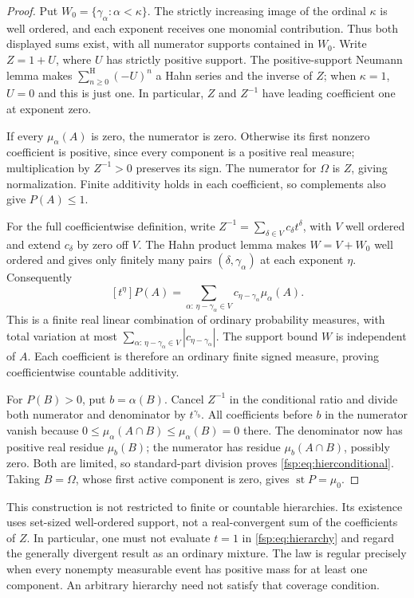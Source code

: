 \documentclass[11pt,a4paper]{article}
\numberwithin{equation}{section}
\theoremstyle{definition}
\theoremstyle{remark}
\newcommand{\st}{\operatorname{st}}
\newcommand{\hsum}{\mathop{\sum}\nolimits^{\mathrm H}}
\begin{document}
\begin{proof}
Put $W_0=\{\gamma_\alpha:\alpha<\kappa\}$. The strictly
increasing image of the ordinal $\kappa$ is well ordered, and each
exponent receives one monomial contribution. Thus both displayed sums
exist, with all numerator supports contained in $W_0$. Write $Z=1+U$,
where $U$ has strictly positive support. The positive-support Neumann
lemma makes $\hsum_{n\ge0}(-U)^n$ a Hahn series and the inverse of
$Z$; when $\kappa=1$, $U=0$ and this is just one. In particular,
$Z$ and $Z^{-1}$ have leading coefficient one at exponent zero.

If every $\mu_\alpha(A)$ is zero, the numerator is zero. Otherwise
its first nonzero coefficient is positive, since every component is a
positive real measure; multiplication by $Z^{-1}>0$ preserves its sign.
The numerator for $\Omega$ is $Z$, giving normalization. Finite
additivity holds in each coefficient, so complements also give $P(A)\le1$.

For the full coefficientwise definition, write
$Z^{-1}=\sum_{\delta\in V}c_\delta t^\delta$, with $V$ well
ordered and extend $c_\delta$ by zero off $V$. The Hahn product lemma
makes $W=V+W_0$ well ordered and gives only finitely many pairs
$(\delta,\gamma_\alpha)$ at each exponent $\eta$. Consequently
\[
 [t^\eta]P(A)=\sum_{\alpha:\,\eta-\gamma_\alpha\in V}
 c_{\eta-\gamma_\alpha}\mu_\alpha(A).
\]
This is a finite real linear combination of ordinary probability
measures, with total variation at most
$\sum_{\alpha:\,\eta-\gamma_\alpha\in V}|c_{\eta-\gamma_\alpha}|$.
The support bound $W$ is independent of $A$. Each coefficient is
therefore an ordinary finite signed measure, proving coefficientwise
countable additivity.

For $P(B)>0$, put $b=\alpha(B)$. Cancel $Z^{-1}$ in the conditional
ratio and divide both numerator and denominator by $t^{\gamma_b}$.
All coefficients before $b$ in the numerator vanish because
$0\le\mu_\alpha(A\cap B)\le\mu_\alpha(B)=0$ there.
The denominator now has positive real residue $\mu_b(B)$; the
numerator has residue $\mu_b(A\cap B)$, possibly zero. Both are
limited, so standard-part division proves \eqref{fsp:eq:hierconditional}.
Taking $B=\Omega$, whose first active component is zero, gives
$\st P=\mu_0$.
\end{proof}

This construction is not restricted to finite or countable hierarchies.
Its existence uses set-sized well-ordered support, not a real-convergent
sum of the coefficients of $Z$. In particular, one must not evaluate
$t=1$ in \eqref{fsp:eq:hierarchy} and regard the generally divergent result
as an ordinary mixture. The law is regular precisely when every nonempty
measurable event has positive mass for at least one component. An arbitrary
hierarchy need not satisfy that coverage condition.
\end{document}
